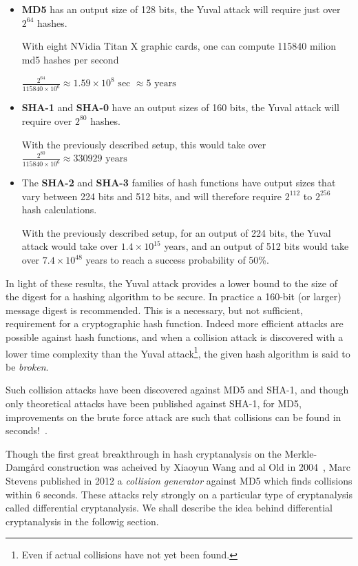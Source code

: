 \begin{itemize}
\item \textbf{MD5} has an output size of 128 bits, the Yuval attack will require just over $2^{64}$ hashes.
  
  With eight NVidia Titan X graphic cards, one can compute 115840 milion md5 hashes per second~\cite{hashcat}
  
 $\frac{2^{64}}{115840 \times 10^6} \approx 1.59 \times 10^8\mbox{ sec } \approx 5 \mbox{ years}$
  
\item \textbf{SHA-1} and \textbf{SHA-0} have an output sizes of 160 bits, the Yuval attack will require over $2^{80}$ hashes.
  
With the previously described setup, this would take over $\frac{2^{80}}{115840 \times 10^6}  \approx 330929 \mbox{ years}$

\item The \textbf{SHA-2} and \textbf{SHA-3} families of hash functions have output sizes that vary between 224 bits and 512 bits, and will therefore require $2^{112}$ to $2^{256}$ hash calculations.

  With the previously described setup, for an output of 224 bits, the Yuval attack would take over $1.4\times 10^{15}$ years, and an output of 512 bits would take over $7.4 \times 10^{48}$ years to reach a success probability of 50\%. 
\end{itemize}

In light of these results, the Yuval attack provides a lower bound to the size of the digest for a hashing algorithm to be secure. In practice a 160-bit (or larger) message digest is recommended.
This is a necessary, but not sufficient, requirement for a cryptographic hash function. Indeed more efficient attacks are possible against hash functions, and when a collision attack is discovered with a lower time complexity than the Yuval attack\footnote{Even if actual collisions have not yet been found.}, the given hash algorithm is said to be \emph{broken}.

Such collision attacks have been discovered against MD5 and SHA-1, and though only theoretical attacks have been published against SHA-1, for MD5, improvements on the brute force attack are such that collisions can be found in seconds!~\cite{Att}.

Though the first great breakthrough in hash cryptanalysis on the Merkle-Damg\r{a}rd construction was acheived by Xiaoyun Wang and al Old in 2004~\cite{WA04}, Marc Stevens published in 2012 a \emph{collision generator} against MD5 which finds collisions within 6 seconds. These attacks rely strongly on a particular type of cryptanalysis called differential cryptanalysis. We shall describe the idea behind differential cryptanalysis in the followig section.


